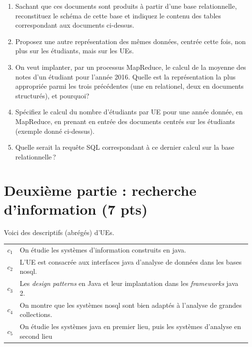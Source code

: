 \documentclass[11pt,a4paper]{article}
\begin{document}
\begin{enumerate}
  \item Sachant que ces documents sont produits à partir d'une base relationnelle, 
  reconstituez le schéma de cette base et indiquez le contenu des tables correspondant
  aux documents ci-dessus.
  
  \item Proposez une autre représentation  des mêmes données, centrée cette fois, non plus sur les étudiants, mais sur les UEs. 
 
   \item On veut implanter, par un processus MapReduce, le calcul de la moyenne des notes d'un étudiant
       pour l'année 2016. Quelle est la représentation la plus appropriée parmi les trois précédentes
       (une en relationel, deux en documents structurés), et pourquoi?
       
   \item Spécifiez le calcul du nombre d'étudiants par UE pour une année donnée, en MapReduce, 
   en prenant en entrée des documents centrés sur les étudiants (exemple donné ci-dessus).
   
      
    \item Quelle serait la requête SQL correspondant à ce dernier calcul sur la base relationnelle\,?
   
\end{enumerate}

\section*{Deuxième partie : recherche d'information (7 pts)}

Voici des descriptifs (abrégés) d'UEs.

\vspace*{0.3cm}


\begin{tabular}{lp{15cm}}
     $c_1$& On étudie les systèmes d'information construits en java.\\
     $c_2$&  L'UE est consacrée aux interfaces java d'analyse de données dans les bases nosql.\\
     $c_3$& Les \textit{design patterns} en Java et leur implantation dans les \textit{frameworks} java 2.\\
     $c_4$& On montre que les systèmes nosql sont bien adaptés à l'analyse de grandes collections.\\
     $c_5$& On étudie les systèmes java en premier lieu, puis les systèmes d'analyse en second lieu\\ 
\end{tabular}
\end{document}
